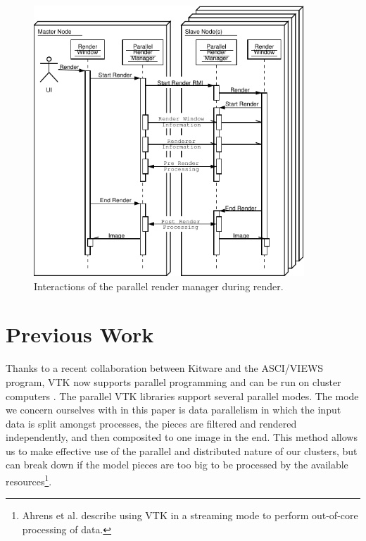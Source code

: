 \documentclass{acmsiggraph}
\begin{document}
  \begin{figure}
    \begin{center}
      \includegraphics[width=4in]
		      {images/ParallelRenderManagerInteraction}
    \end{center}
    \caption{Interactions of the parallel render manager during render.}
    \label{fig:parallel_render_manager_interaction}
  \end{figure}


  \section{Previous Work}
  \label{sec:previous_work}

  Thanks to a recent collaboration between Kitware and the ASCI/VIEWS
  program, VTK now supports parallel programming and can be run on cluster
  computers \cite{Ahrens00}.  The parallel VTK libraries support several
  parallel modes.  The mode we concern ourselves with in this paper is data
  parallelism in which the input data is split amongst processes, the
  pieces are filtered and rendered independently, and then composited to
  one image in the end.  This method allows us to make effective use of the
  parallel and distributed nature of our clusters, but can break down if
  the model pieces are too big to be processed by the available
  resources\footnote{Ahrens et al. \cite{Ahrens01} describe using VTK in a
  streaming mode to perform out-of-core processing of data.}.
\end{document}
